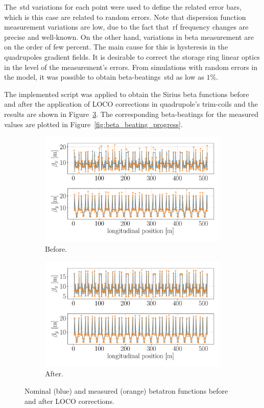 The~\gls{std} variations for each point were used to define the related error bars, which is this case are related to random errors. Note that dispersion function measurement variations are low, due to the fact that~\gls{rf} frequency changes are precise and well-known. On the other hand, variations in beta measurement are on the order of few percent. The main cause for this is hysteresis in the quadrupoles gradient fields. It is desirable to correct the storage ring linear optics in the level of the measurement's errors. From simulations with random errors in the model, it was possible to obtain beta-beatings~\gls{std} as low as $1\%$.

The implemented script was applied to obtain the Sirius beta functions before and after the application of LOCO corrections in quadrupole's trim-coils and the results are shown in Figure~\ref{fig:beta_tuneshift}. The corresponding beta-beatings for the measured values are plotted in Figure~\ref{fig:beta_beating_progress}.
\begin{figure}
\centering
\begin{subfigure}[t]{0.49\textwidth}
\includegraphics[width=1.0\textwidth]{figures/beta_before_big.pdf}
    \caption{Before.}
    \label{subfig:beta_before}
\end{subfigure}
 \begin{subfigure}[t]{0.49\textwidth}
\includegraphics[width=1.0\textwidth]{figures/beta_after_big.pdf}
    \caption{After.}
    \label{subfig:beta_after}
\end{subfigure}
\caption{Nominal (blue) and measured (orange) betatron functions before and after LOCO corrections.}
\label{fig:beta_tuneshift}
\end{figure}
